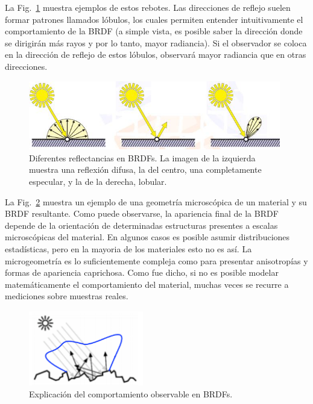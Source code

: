 La Fig.~\ref{fg:contribuciones} muestra ejemplos de estos rebotes.
Las direcciones de reflejo suelen formar patrones llamados lóbulos, los cuales permiten entender intuitivamente el comportamiento de la BRDF (a simple vista, es posible saber la dirección donde se dirigirán más rayos y por lo tanto, mayor radiancia).
Si el observador se coloca en la dirección de reflejo de estos lóbulos, observará mayor radiancia que en otras direcciones.

\begin{figure}
\center
\includegraphics[width=11cm]{figures/contribuciones}
\caption[Diferentes reflectancias en BRDFs]{Diferentes reflectancias en BRDFs. La imagen de la izquierda muestra una reflexión difusa, la del centro, una completamente especular, y la de la derecha, lobular.}
\label{fg:contribuciones}
\end{figure}

La Fig.~\ref{fg:microestructura} muestra un ejemplo de una geometría microscópica de un material y su BRDF resultante.
Como puede observarse, la apariencia final de la BRDF depende de la orientación de determinadas estructuras presentes a escalas microscópicas del material.
En algunos casos es posible asumir distribuciones estadísticas, pero en la mayoria de los materiales esto no es así.
La microgeometría es lo suficientemente compleja como para presentar anisotropías y formas de apariencia caprichosa.
Como fue dicho, si no es posible modelar matemáticamente el comportamiento del material, muchas veces se recurre a mediciones sobre muestras reales.


\begin{figure}
\center
\includegraphics[width=5cm]{figures/microestructura}
\caption{Explicación del comportamiento observable en BRDFs.}
\label{fg:microestructura}
\end{figure}


